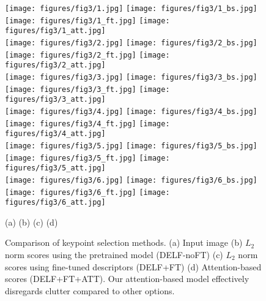 \documentclass[10pt,twocolumn,letterpaper]{article}
\begin{document}
\begin{figure}[!h]
\vspace{0.1cm}
\begin{center}
\texttt{[image: figures/fig3/1.jpg]}
   \texttt{[image: figures/fig3/1\_bs.jpg]}
   \texttt{[image: figures/fig3/1\_ft.jpg]}
   \texttt{[image: figures/fig3/1\_att.jpg]}\\
	\vspace{0.05cm}
   \texttt{[image: figures/fig3/2.jpg]}
   \texttt{[image: figures/fig3/2\_bs.jpg]}
   \texttt{[image: figures/fig3/2\_ft.jpg]}
   \texttt{[image: figures/fig3/2\_att.jpg]}\\
	\vspace{0.05cm}
   \texttt{[image: figures/fig3/3.jpg]}
   \texttt{[image: figures/fig3/3\_bs.jpg]}
   \texttt{[image: figures/fig3/3\_ft.jpg]}
   \texttt{[image: figures/fig3/3\_att.jpg]}\\
	\vspace{0.05cm}
   \texttt{[image: figures/fig3/4.jpg]}
   \texttt{[image: figures/fig3/4\_bs.jpg]}
   \texttt{[image: figures/fig3/4\_ft.jpg]}
   \texttt{[image: figures/fig3/4\_att.jpg]}\\
	\vspace{0.05cm}
   \texttt{[image: figures/fig3/5.jpg]}
   \texttt{[image: figures/fig3/5\_bs.jpg]}
   \texttt{[image: figures/fig3/5\_ft.jpg]}
   \texttt{[image: figures/fig3/5\_att.jpg]}\\
	\vspace{0.05cm}
   \texttt{[image: figures/fig3/6.jpg]}
   \texttt{[image: figures/fig3/6\_bs.jpg]}
   \texttt{[image: figures/fig3/6\_ft.jpg]}
   \texttt{[image: figures/fig3/6\_att.jpg]}\\
	\vspace{-0.1cm}
\centerline{\footnotesize (a) \hspace{1.7cm} (b) \hspace{1.7cm} (c) \hspace{1.7cm} (d)}
	\vspace{-0.5cm}
\end{center}
	\caption{Comparison of keypoint selection methods. (a) Input image (b) $L_2$ norm scores using the pretrained model (DELF-noFT) (c) $L_2$ norm scores using fine-tuned descriptors (DELF+FT) (d) Attention-based scores (DELF+FT+ATT).  Our attention-based model effectively disregards clutter compared to other options.}
\label{fig:vis_att}
\vspace{-20pt}                                                                                                                                                                                                           
\end{figure}
\end{document}
